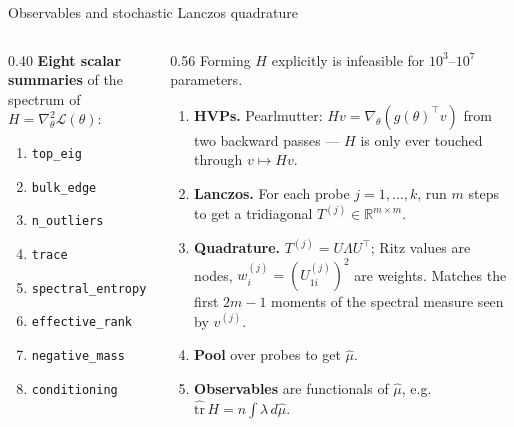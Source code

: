 \documentclass[aspectratio=169,10pt]{beamer}
\newcommand{\R}{\mathbb{R}}
\newcommand{\Loss}{\mathcal{L}}
\begin{document}
\begin{frame}{Observables and stochastic Lanczos quadrature}
\begin{columns}[T,onlytextwidth]
\begin{column}{0.40\textwidth}
\textbf{Eight scalar summaries} of the spectrum of
$H = \nabla^2_\theta \Loss(\theta)$:
\footnotesize
\begin{enumerate}\setlength\itemsep{0pt}
  \item \texttt{top\_eig}
  \item \texttt{bulk\_edge}
  \item \texttt{n\_outliers}
  \item \texttt{trace}
  \item \texttt{spectral\_entropy}
  \item \texttt{effective\_rank}
  \item \texttt{negative\_mass}
  \item \texttt{conditioning}
\end{enumerate}
\end{column}
\begin{column}{0.56\textwidth}\footnotesize
Forming $H$ explicitly is infeasible for $10^3$--$10^7$ parameters.
\begin{enumerate}\setlength\itemsep{1pt}
  \item \textbf{HVPs.} Pearlmutter: $Hv = \nabla_\theta(g(\theta)^\top v)$ from
        two backward passes --- $H$ is only ever touched through $v \mapsto Hv$.
  \item \textbf{Lanczos.} For each probe $j=1,\dots,k$, run $m$ steps to get a
        tridiagonal $T^{(j)} \in \R^{m\times m}$.
  \item \textbf{Quadrature.} $T^{(j)} = U\Lambda U^\top$; Ritz values are nodes,
        $w_i^{(j)} = (U^{(j)}_{1i})^2$ are weights. Matches the first $2m-1$
        moments of the spectral measure seen by $v^{(j)}$.
  \item \textbf{Pool} over probes to get $\hat\mu$.
  \item \textbf{Observables} are functionals of $\hat\mu$, e.g.\
        $\widehat{\mathrm{tr}}\,H = n\!\int\! \lambda \, d\hat\mu$.
\end{enumerate}
\end{column}
\end{columns}
\end{frame}
\end{document}
